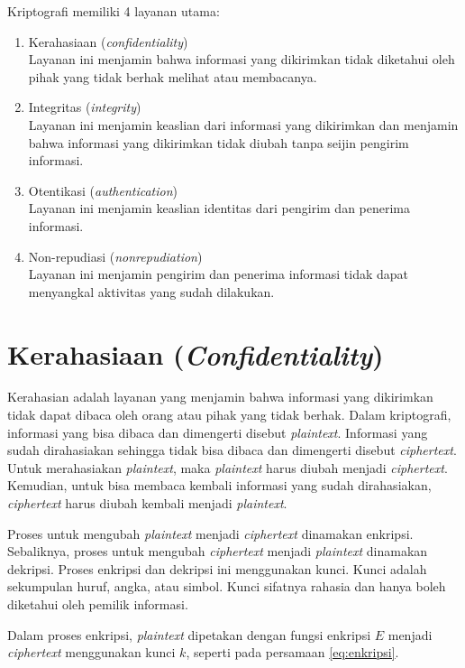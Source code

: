 Kriptografi memiliki 4 layanan utama:
\begin{enumerate}
	\item Kerahasiaan (\textit{confidentiality})\\
	Layanan ini menjamin bahwa informasi yang dikirimkan tidak diketahui oleh pihak yang tidak berhak melihat atau membacanya.
	\item Integritas (\textit{integrity})\\
	Layanan ini menjamin keaslian dari informasi yang dikirimkan dan menjamin bahwa informasi yang dikirimkan tidak diubah tanpa seijin pengirim informasi.
	\item Otentikasi (\textit{authentication})\\
	Layanan ini menjamin keaslian identitas dari pengirim dan penerima informasi.
	\item Non-repudiasi (\textit{nonrepudiation})\\
	Layanan ini menjamin pengirim dan penerima informasi tidak dapat menyangkal aktivitas yang sudah dilakukan.
\end{enumerate}

\section{Kerahasiaan (\textit{Confidentiality})}

Kerahasian adalah layanan yang menjamin bahwa informasi yang dikirimkan tidak dapat dibaca oleh orang atau pihak yang tidak berhak. Dalam kriptografi, informasi yang bisa dibaca dan dimengerti disebut \textit{plaintext}. Informasi yang sudah dirahasiakan sehingga tidak bisa dibaca dan dimengerti disebut \textit{ciphertext}. Untuk merahasiakan \textit{plaintext}, maka \textit{plaintext} harus diubah menjadi \textit{ciphertext}. Kemudian, untuk bisa membaca kembali informasi yang sudah dirahasiakan, \textit{ciphertext} harus diubah kembali menjadi \textit{plaintext}.

Proses untuk mengubah \textit{plaintext} menjadi \textit{ciphertext} dinamakan enkripsi. Sebaliknya, proses untuk mengubah \textit{ciphertext} menjadi \textit{plaintext} dinamakan dekripsi. Proses enkripsi dan dekripsi ini menggunakan kunci. Kunci adalah sekumpulan huruf, angka, atau simbol. Kunci sifatnya rahasia dan hanya boleh diketahui oleh pemilik informasi.

Dalam proses enkripsi, \textit{plaintext} dipetakan dengan fungsi enkripsi \begin{math}E\end{math} menjadi \textit{ciphertext} menggunakan kunci \begin{math}k\end{math}, seperti pada persamaan \ref{eq:enkripsi}.

